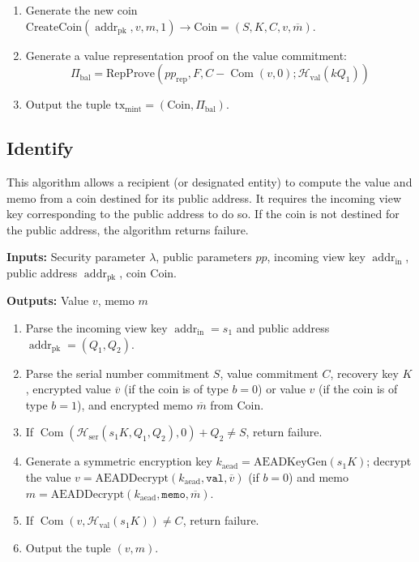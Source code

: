 \documentclass{llncs}
\newcommand{\hash}{\mathcal{H}}
\newcommand{\addr}{\operatorname{addr}}
\newcommand{\com}{\operatorname{Com}}
\begin{document}
\begin{enumerate}
\item Generate the new coin $\text{CreateCoin}(\addr_{\text{pk}}, v, m, 1) \to \text{Coin} = (S, K, C, v, \overline{m})$.
\item Generate a value representation proof on the value commitment: $$\Pi_{\text{bal}} = \text{RepProve}(pp_{\text{rep}},F,C - \com(v,0); \hash_{\text{val}}(kQ_1))$$
\item Output the tuple $\text{tx}_{\text{mint}} = (\text{Coin}, \Pi_{\text{bal}})$.
\end{enumerate}


\subsection{Identify}

This algorithm allows a recipient (or designated entity) to compute the value and memo from a coin destined for its public address.
It requires the incoming view key corresponding to the public address to do so.
If the coin is not destined for the public address, the algorithm returns failure.

\textbf{Inputs:} Security parameter $\lambda$, public parameters $pp$, incoming view key $\addr_{\text{in}}$, public address $\addr_{\text{pk}}$, coin $\text{Coin}$.

\textbf{Outputs:} Value $v$, memo $m$

\begin{enumerate}
\item Parse the incoming view key $\addr_{\text{in}} = s_1$ and public address $\addr_{\text{pk}} = (Q_1, Q_2)$.
\item Parse the serial number commitment $S$, value commitment $C$, recovery key $K$, encrypted value $\overline{v}$ (if the coin is of type $b=0$) or value $v$ (if the coin is of type $b=1$), and encrypted memo $\overline{m}$ from $\text{Coin}$.
\item If $\com(\hash_{\text{ser}}(s_1 K,Q_1,Q_2), 0) + Q_2 \neq S$, return failure.
\item Generate a symmetric encryption key $k_{\text{aead}} = \text{AEADKeyGen}(s_1 K)$; decrypt the value $v = \text{AEADDecrypt}(k_{\text{aead}},\texttt{val},\overline{v})$ (if $b=0$) and memo $m = \text{AEADDecrypt}(k_{\text{aead}},\texttt{memo},\overline{m})$.
\item If $\com(v,\hash_{\text{val}}(s_1 K)) \neq C$, return failure.
\item Output the tuple $(v, m)$.
\end{enumerate}
\end{document}
